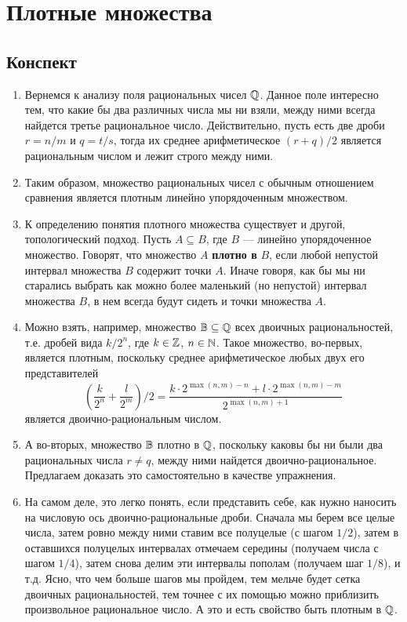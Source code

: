 \section{Плотные множества}

\subsection*{Конспект}

\begin{enumerate}
\item Вернемся к анализу поля рациональных чисел $\mathbb Q$. Данное поле интересно тем, что какие бы два различных числа мы ни взяли, между ними всегда найдется третье рациональное число. Действительно, пусть есть две дроби $r=n/m$ и $q=t/s$, тогда их среднее арифметическое $(r+q)/2$ является рациональным числом и лежит строго между ними.
\item Таким образом, множество рациональных чисел с обычным отношением сравнения является плотным линейно упорядоченным множеством.
\item К определению понятия плотного множества существует и другой, топологический подход. Пусть $A\subseteq B$, где $B$ --- линейно упорядоченное множество. Говорят, что множество $A$ \textbf{плотно в} $B$, если любой непустой интервал множества $B$ содержит точки $A$. Иначе говоря, как бы мы ни старались выбрать как можно более маленький (но непустой) интервал множества $B$, в нем всегда будут сидеть и точки множества $A$.
\item Можно взять, например, множество $\mathbb B\subseteq\mathbb Q$ всех двоичных рациональностей, т.е. дробей вида $k/2^n$, где $k\in\mathbb Z$, $n\in\mathbb N$. Такое множество, во-первых, является плотным, поскольку среднее арифметическое любых двух его представителей
$$
\left(\frac{k}{2^n}+\frac{l}{2^m}\right)/2 = \frac{k\cdot 2^{\max(n,m)-n}+l\cdot 2^{\max(n,m)-m}}{2^{\max(n,m)+1}}
$$
является двоично-рациональным числом.
\item А во-вторых, множество $\mathbb B$ плотно в $\mathbb Q$, поскольку каковы бы ни были два рациональных числа $r\ne q$, между ними найдется двоично-рациональное. Предлагаем доказать это самостоятельно в качестве упражнения.
\item На самом деле, это легко понять, если представить себе, как нужно наносить на числовую ось двоично-рациональные дроби. Сначала мы берем все целые числа, затем ровно между ними ставим все полуцелые (с шагом $1/2$), затем в оставшихся полуцелых интервалах отмечаем середины (получаем числа с шагом $1/4$), затем снова делим эти интервалы пополам (получаем шаг $1/8$), и т.д. Ясно, что чем больше шагов мы пройдем, тем мельче будет сетка двоичных рациональностей, тем точнее с их помощью можно приблизить произвольное рациональное число. А это и есть свойство быть плотным в $\mathbb Q$.

\end{enumerate}
